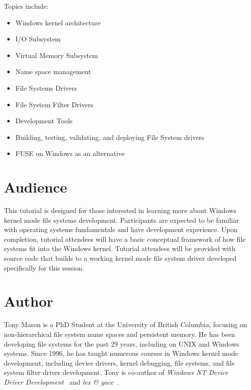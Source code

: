 \documentclass[letter,11pt]{article}
\begin{document}
\vspace{0.2cm}

Topics include:

\begin{itemize}

\item Windows kernel architecture
\item I/O Subsystem
\item Virtual Memory Subsystem
\item Name space management
\item File Systems Drivers
\item File System Filter Drivers
\item Development Tools
\item Building, testing, validating, and deploying File System drivers
\item FUSE on Windows as an alternative
\end{itemize}

\section*{Audience}

This tutorial is designed for those interested in learning more about Windows kernel mode file systems development.  Participants are expected to be familiar with operating systems fundamentals and have development experience.  Upon completion, tutorial attendees will have a basic conceptual framework of how file systems fit into the Windows kernel.  Tutorial attendees will be provided with source code that builds to a working kernel mode file system driver developed specifically for this session.


\section*{Author}

Tony Mason is a PhD Student at the University of British Columbia, focusing on non-hierarchical file system name spaces and persistent memory.  He has been developing file systems for the past 29 years, including on UNIX and Windows systems.  Since 1996, he has taught numerous courses in Windows kernel mode development, including device drivers, kernel debugging, file systems, and file system filter driver development.  Tony is co-author of \textit{Windows NT Device Driver Development}~\cite{viscarola1998windows} and \textit{lex \& yacc}~\cite{levine1992lex}.

\printbibliography[title={Bibliography}]
\end{document}
